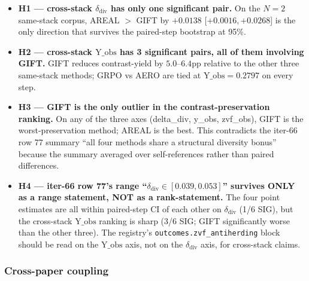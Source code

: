 \begin{itemize}
\item \textbf{H1 --- cross-stack $\delta_{\mathrm{div}}$ has only one
      significant pair.} On the $N\!=\!2$ same-stack corpus,
      AREAL $>$ GIFT by $+0.0138$ [$+0.0016,+0.0268$] is the only
      direction that survives the paired-step bootstrap at 95\%.
\item \textbf{H2 --- cross-stack $\mathrm{Y\_obs}$ has 3 significant pairs,
      all of them involving GIFT.} GIFT reduces contrast-yield
      by $5.0$--$6.4$pp relative to the other three same-stack methods;
      GRPO vs AERO are tied at $\mathrm{Y\_obs}=0.2797$ on every step.
\item \textbf{H3 --- GIFT is the only outlier in the contrast-preservation
      ranking.} On any of the three axes (delta\_div, y\_obs, zvf\_obs),
      GIFT is the worst-preservation method; AREAL is the best.
      This contradicts the iter-66 row 77 summary ``all four methods
      share a structural diversity bonus'' because the summary
      averaged over self-references rather than paired differences.
\item \textbf{H4 --- iter-66 row 77's range ``$\delta_{\mathrm{div}}
      \in [0.039, 0.053]$'' survives ONLY as a range statement, NOT as
      a rank-statement.} The four point estimates are all within
      paired-step CI of each other on $\delta_{\mathrm{div}}$
      (1/6 SIG), but the cross-stack
      $\mathrm{Y\_obs}$ ranking is sharp (3/6 SIG; GIFT significantly
      worse than the other three). The registry's
      \texttt{outcomes.zvf\_antiherding} block should be read on
      the $\mathrm{Y\_obs}$ axis, not on the $\delta_{\mathrm{div}}$
      axis, for cross-stack claims.
\end{itemize}

\subsubsection{Cross-paper coupling}

